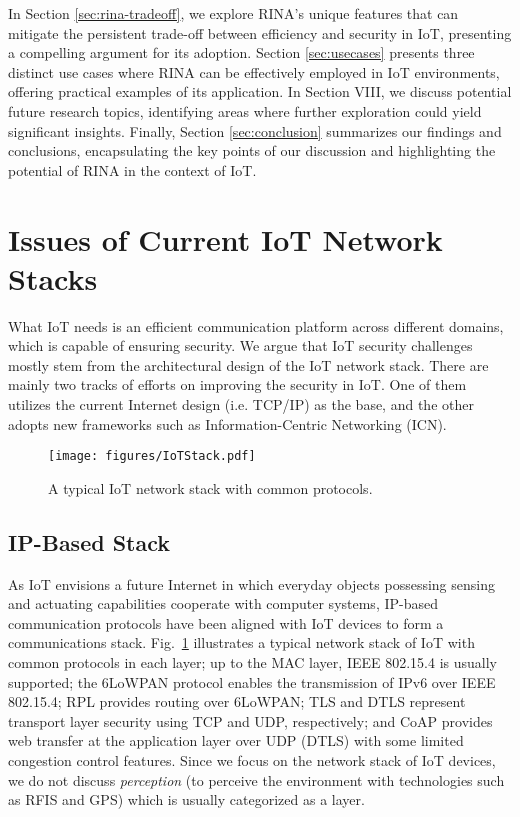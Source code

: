 \documentclass{ieeeaccess}
\begin{document}
In Section \ref{sec:rina-tradeoff}, we explore RINA’s unique features that can mitigate the persistent trade-off between efficiency and security in IoT, presenting a compelling argument for its adoption. Section \ref{sec:usecases} presents three distinct use cases where RINA can be effectively employed in IoT environments, offering practical examples of its application. In Section VIII, we discuss potential future research topics, identifying areas where further exploration could yield significant insights. Finally, Section \ref{sec:conclusion} summarizes our findings and conclusions, encapsulating the key points of our discussion and highlighting the potential of RINA in the context of IoT.


\section{Issues of Current IoT Network Stacks} \label{sec:iot}
What IoT needs is an efficient communication platform across different domains, which is capable of ensuring security. We argue that IoT security challenges mostly stem from the architectural design of the IoT network stack. There are mainly two tracks of efforts on improving the security in IoT. One of them utilizes the current Internet design (i.e. TCP/IP) as the base, and the other adopts new frameworks such as Information-Centric Networking (ICN).  



\begin{figure} 
	\centering
	\texttt{[image: figures/IoTStack.pdf]}
	\caption{A typical IoT network stack with common protocols.}
	\label{fig:IoTStack}
\end{figure}


\subsection{IP-Based Stack}
As IoT envisions a future Internet in which everyday objects possessing sensing and actuating capabilities cooperate with computer systems, IP-based communication protocols have been aligned with IoT devices to form a communications stack. 
Fig.~\ref{fig:IoTStack} illustrates a typical network stack of IoT with common protocols in each layer; up to the MAC layer, IEEE 802.15.4 \cite{6012487} is usually supported; the 6LoWPAN protocol \cite{rfc4919} enables the transmission of IPv6 over IEEE 802.15.4; RPL \cite{rfc6282} provides routing over 6LoWPAN; TLS \cite{rfc5246} and DTLS \cite{rfc6347} represent transport layer security using TCP and UDP, respectively; and CoAP \cite{rfc7252} provides web transfer at the application layer over UDP (DTLS) with some limited congestion control features. Since we focus on the network stack of IoT devices, we do not discuss \textit{perception} (to perceive the environment with technologies such as RFIS and GPS) which is usually categorized as a layer.
\end{document}
